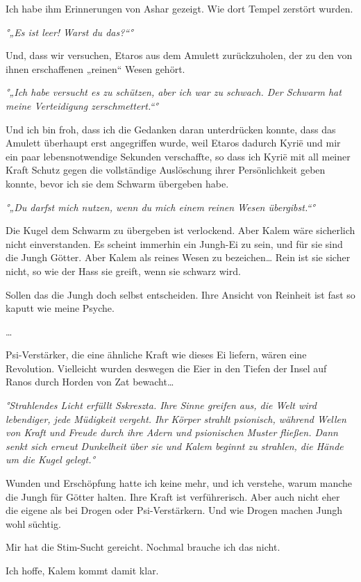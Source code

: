 \documentclass[11pt]{article}
\begin{document}
Ich habe ihm Erinnerungen von Ashar gezeigt. Wie dort Tempel zerstört
wurden.

\emph{°„Es ist leer! Warst du das?``°}

Und, dass wir versuchen, Etaros aus dem Amulett zurückzuholen, der zu
den von ihnen erschaffenen „reinen`` Wesen gehört.

\emph{°„Ich habe versucht es zu schützen, aber ich war zu schwach. Der
Schwarm hat meine Verteidigung zerschmettert.``°}

Und ich bin froh, dass ich die Gedanken daran unterdrücken konnte, dass
das Amulett überhaupt erst angegriffen wurde, weil Etaros dadurch Kyrië
und mir ein paar lebensnotwendige Sekunden verschaffte, so dass ich
Kyrië mit all meiner Kraft Schutz gegen die vollständige Auslöschung
ihrer Persönlichkeit geben konnte, bevor ich sie dem Schwarm übergeben
habe.

\emph{°„Du darfst mich nutzen, wenn du mich einem reinen Wesen
übergibst.``°}

Die Kugel dem Schwarm zu übergeben ist verlockend. Aber Kalem wäre
sicherlich nicht einverstanden. Es scheint immerhin ein Jungh-Ei zu
sein, und für sie sind die Jungh Götter. Aber Kalem als reines Wesen zu
bezeichen\ldots{} Rein ist sie sicher nicht, so wie der Hass sie greift,
wenn sie schwarz wird.

Sollen das die Jungh doch selbst entscheiden. Ihre Ansicht von Reinheit
ist fast so kaputt wie meine Psyche.

\ldots{}

Psi-Verstärker, die eine ähnliche Kraft wie dieses Ei liefern, wären
eine Revolution. Vielleicht wurden deswegen die Eier in den Tiefen der
Insel auf Ranos durch Horden von Zat bewacht\ldots{}

\emph{°Strahlendes Licht erfüllt Sskreszta. Ihre Sinne greifen aus, die
Welt wird lebendiger, jede Müdigkeit vergeht. Ihr Körper strahlt
psionisch, während Wellen von Kraft und Freude durch ihre Adern und
psionischen Muster fließen. Dann senkt sich erneut Dunkelheit über sie
und Kalem beginnt zu strahlen, die Hände um die Kugel gelegt.°}

Wunden und Erschöpfung hatte ich keine mehr, und ich verstehe, warum
manche die Jungh für Götter halten. Ihre Kraft ist verführerisch. Aber
auch nicht eher die eigene als bei Drogen oder Psi-Verstärkern. Und wie
Drogen machen Jungh wohl süchtig.

Mir hat die Stim-Sucht gereicht. Nochmal brauche ich das nicht.

Ich hoffe, Kalem kommt damit klar.
\end{document}
